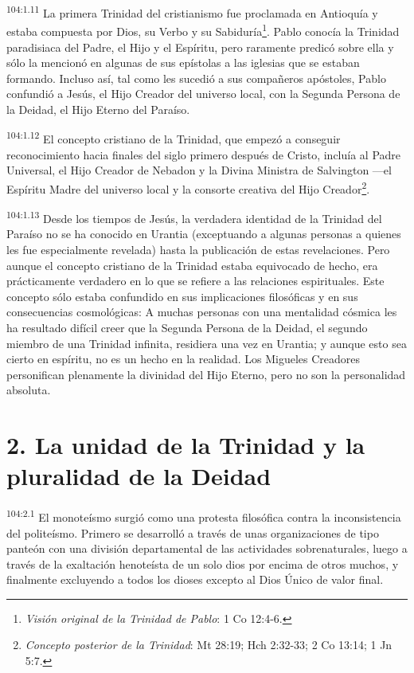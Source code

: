 \par
\textsuperscript{104:1.11} La primera Trinidad del cristianismo fue proclamada en Antioquía y estaba compuesta por Dios, su Verbo y su Sabiduría\footnote{\textit{Visión original de la Trinidad de Pablo}: 1 Co 12:4-6.}. Pablo conocía la Trinidad paradisiaca del Padre, el Hijo y el Espíritu, pero raramente predicó sobre ella y sólo la mencionó en algunas de sus epístolas a las iglesias que se estaban formando. Incluso así, tal como les sucedió a sus compañeros apóstoles, Pablo confundió a Jesús, el Hijo Creador del universo local, con la Segunda Persona de la Deidad, el Hijo Eterno del Paraíso.

\par
\textsuperscript{104:1.12} El concepto cristiano de la Trinidad, que empezó a conseguir reconocimiento hacia finales del siglo primero después de Cristo, incluía al Padre Universal, el Hijo Creador de Nebadon y la Divina Ministra de Salvington ---el Espíritu Madre del universo local y la consorte creativa del Hijo Creador\footnote{\textit{Concepto posterior de la Trinidad}: Mt 28:19; Hch 2:32-33; 2 Co 13:14; 1 Jn 5:7.}.

\par
\textsuperscript{104:1.13} Desde los tiempos de Jesús, la verdadera identidad de la Trinidad del Paraíso no se ha conocido en Urantia (exceptuando a algunas personas a quienes les fue especialmente revelada) hasta la publicación de estas revelaciones. Pero aunque el concepto cristiano de la Trinidad estaba equivocado de hecho, era prácticamente verdadero en lo que se refiere a las relaciones espirituales. Este concepto sólo estaba confundido en sus implicaciones filosóficas y en sus consecuencias cosmológicas: A muchas personas con una mentalidad cósmica les ha resultado difícil creer que la Segunda Persona de la Deidad, el segundo miembro de una Trinidad infinita, residiera una vez en Urantia; y aunque esto sea cierto en espíritu, no es un hecho en la realidad. Los Migueles Creadores personifican plenamente la divinidad del Hijo Eterno, pero no son la personalidad absoluta.

\section*{2. La unidad de la Trinidad y la pluralidad de la Deidad}
\par
\textsuperscript{104:2.1} El monoteísmo surgió como una protesta filosófica contra la inconsistencia del politeísmo. Primero se desarrolló a través de unas organizaciones de tipo panteón con una división departamental de las actividades sobrenaturales, luego a través de la exaltación henoteísta de un solo dios por encima de otros muchos, y finalmente excluyendo a todos los dioses excepto al Dios Único de valor final.

